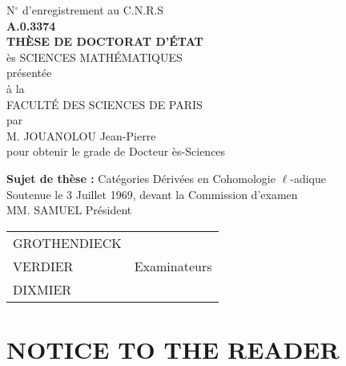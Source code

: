 \documentclass[12pt,twoside]{report} %
\theoremstyle{plain}
\theoremstyle{definition}
\begin{document}
\thispagestyle{empty}
\vspace*{\fill}
\begin{center}
    {\large N$^\circ$ d'enregistrement au C.N.R.S} \\
    \vspace{0.5em}
    {\bf A.0.3374} \\
    \vspace{4em}
    {\LARGE\bf THÈSE DE DOCTORAT D'ÉTAT} \\
    \vspace{0.5em}
    {\large ès SCIENCES MATHÉMATIQUES} \\
    \vspace{1em}
    présentée \\
    à la \\
    FACULTÉ DES SCIENCES DE PARIS \\
    \vspace{2em}
    par \\
    \vspace{2em}
    {\Large M. JOUANOLOU Jean-Pierre} \\
    \vspace{1em}
    pour obtenir le grade de Docteur ès-Sciences \\
\end{center}
\vspace*{\fill}
\begin{center}
    {\bf Sujet de thèse :} {\Large Catégories Dérivées en Cohomologie $\ell$-adique} \\
    \vspace{1em}
    Soutenue le 3 Juillet 1969, devant la Commission d'examen \\
    \vspace{1em}
    MM. SAMUEL \quad\quad Président \\
    \vspace{0.5em}
\begin{tabular}{@{}l@{\hspace{3cm}}r@{}}
GROTHENDIECK & \\
VERDIER & Examinateurs \\
DIXMIER & \\
\end{tabular}
\end{center}
\vspace*{\fill}

\chapter*{NOTICE TO THE READER}
\label{ch:pref}
\end{document}
